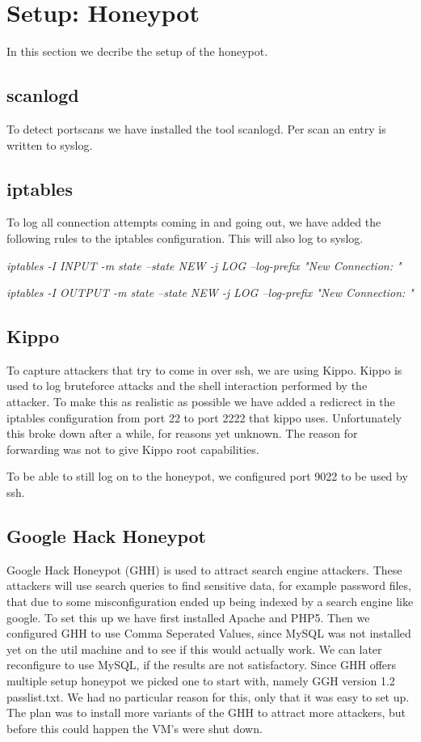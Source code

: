 \documentclass[11pt]{article} %
\begin{document}
\section{Setup: Honeypot}

In this section we decribe the setup of the honeypot.

\subsection{scanlogd}

To detect portscans we have installed the tool scanlogd.
Per scan an entry is written to syslog.

\subsection{iptables}
To log all connection attempts coming in and going out, we have added the following rules to the iptables configuration. 
This will also log to syslog.

\emph{iptables -I INPUT -m state --state NEW -j LOG --log-prefix "New Connection: "}

\emph{iptables -I OUTPUT -m state --state NEW -j LOG --log-prefix "New Connection: "}


\subsection{Kippo}
To capture attackers that try to come in over ssh, we are using Kippo. 
Kippo is used to log bruteforce attacks and the shell interaction performed by the attacker. 
To make this as realistic as possible we have added a redicrect in the iptables configuration from port 22 to port 2222 that kippo uses. 
Unfortunately this broke down after a while, for reasons yet unknown. 
The reason for forwarding was not to give Kippo root capabilities.

To be able to still log on to the honeypot, we configured port 9022 to be used by ssh.

\subsection{Google Hack Honeypot}
Google Hack Honeypot (GHH) is used to attract search engine attackers. 
These attackers will use search queries to find sensitive data, for example password files, that due to some misconfiguration ended up being indexed by a search engine like google.
To set this up we have first installed Apache and PHP5.
Then we configured GHH to use Comma Seperated Values, since MySQL was not installed yet on the util machine and to see if this would actually work. 
We can later reconfigure to use MySQL, if the results are not satisfactory.
Since GHH offers multiple setup honeypot we picked one to start with, namely GGH version 1.2 passlist.txt.
We had no particular reason for this, only that it was easy to set up. 
The plan was to install more variants of the GHH to attract more attackers, but before this could happen the VM's were shut down.
\end{document}
